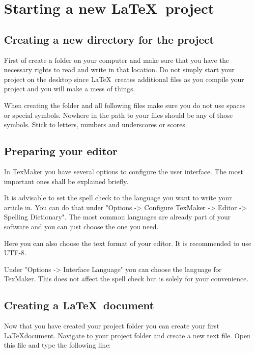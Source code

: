 \documentclass[justified, notoc]{tufte-book} %
\begin{document}
\chapter{Starting a new \LaTeX\ project}


\section{Creating a new directory for the project}

First of create a folder on your computer and make sure that you have the necessary rights to read and write in that location. Do not simply start your project on the desktop since \LaTeX\ creates additional files as you compile your project and you will make a mess of things.
 
When creating the folder and all following files make sure you do not use spaces or special symbols. Nowhere in the path to your files should be any of those symbols. Stick to letters, numbers and underscores or scores. 


\section{Preparing your editor}

In TexMaker you have several options to configure the user interface. The most important ones shall be explained briefly. 

It is advisable to set the spell check to the language you want to write your article in. You can do that under "Options -> Configure TexMaker -> Editor -> Spelling Dictionary". The most common languages are already part of your software and you can just choose the one you need.  

Here you can also choose the text format of your editor. It is recommended to use UTF-8.

Under "Options -> Interface Language" you can choose the language for TexMaker. This does not affect the spell check but is solely for your convenience.  


\section{Creating a \LaTeX\ document}

Now that you have created your project folder you can create your first \LaTeX document. Navigate to your project folder and create a new text file. Open this file and type the following line:\\[5pt]
\end{document}
